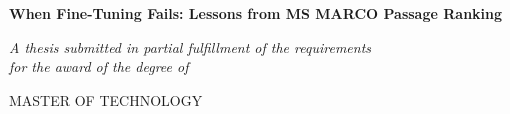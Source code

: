 \frontmatter%

\pagestyle{plain} %

\begin{titlepage}
\begin{center}
\begin{spacing}{1.2}

{\huge \bfseries When Fine-Tuning Fails: Lessons from MS MARCO Passage Ranking\par}  %

\vspace {5mm}
\textit{A thesis submitted in partial fulfillment of the requirements\\for the award of the degree of} 

\vspace{7mm}
\textsc{\huge MASTER OF TECHNOLOGY}


\end{spacing}
\end{center}
\end{titlepage}
